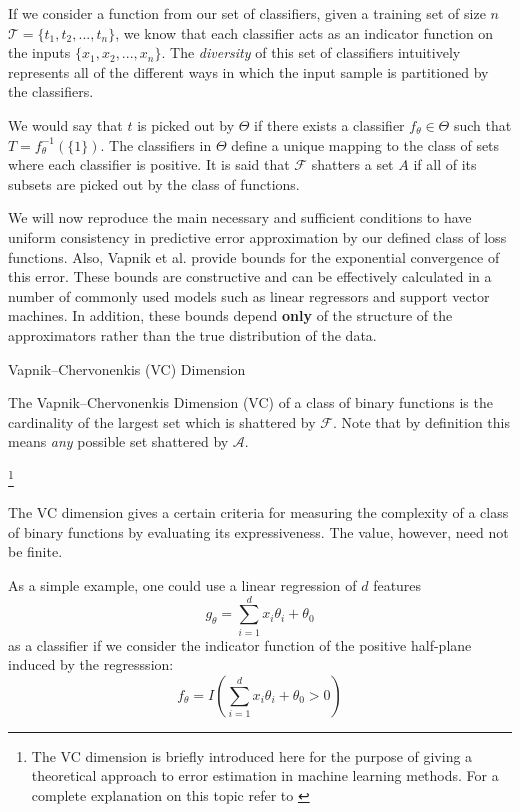 If we consider a function from our set of classifiers, given a training set of size $n$
$\mathcal {T} = \{ t_1,t_2,...,t_n  \}$, we know that each classifier acts as an indicator function on the inputs $\{ x_1,x_2,...,x_n  \}$. The \textit{diversity} of this set of classifiers intuitively represents all of the different ways in which the input sample is partitioned by the classifiers.

We would say that $t$ is picked out by $\Theta$ if there exists a classifier $f_{\theta} \in \Theta$ such that $T = f_{\theta}^{-1}(\{1\})$. The classifiers in $\Theta$ define a unique mapping to the class of sets where each classifier is positive. It is said that $\mathcal {F}$ shatters a set $A$ if all of its subsets are picked out by the class of functions.

We will now reproduce the main necessary and sufficient conditions to have uniform consistency in predictive error approximation by our defined class of loss functions. Also,
Vapnik et al. provide bounds for the exponential convergence of this error. These bounds are constructive and can be effectively calculated in a number of commonly used models such as linear regressors and support vector machines. In addition, these bounds depend \textbf{only} of the structure of the approximators rather than the true distribution of the data.


\begin{definition}{Vapnik--Chervonenkis (VC) Dimension}

The Vapnik--Chervonenkis Dimension (VC) of a class of binary functions is the cardinality of the largest set which is shattered by $\mathcal {F}$. Note that by definition this means \textit{any} possible set shattered by $\mathcal {A}$.
\end{definition}\footnote{The VC dimension is briefly introduced here for the purpose of giving a theoretical approach to error estimation in machine learning methods. For a complete explanation on this topic refer to \textcite{vapnik-nature2013}}

The VC dimension gives a certain criteria for measuring the complexity of a class of binary functions by evaluating its expressiveness. The value, however, need not be finite.

As a simple example, one could use a linear regression of $d$ features $$g_{\theta} = \sum_{i=1}^d x_i \theta_i + \theta_0$$ as a classifier if we consider the indicator function of the positive half-plane induced by the regresssion: $$f_{\theta} = I(\sum_{i=1}^d x_i \theta_i + \theta_0 > 0)$$

